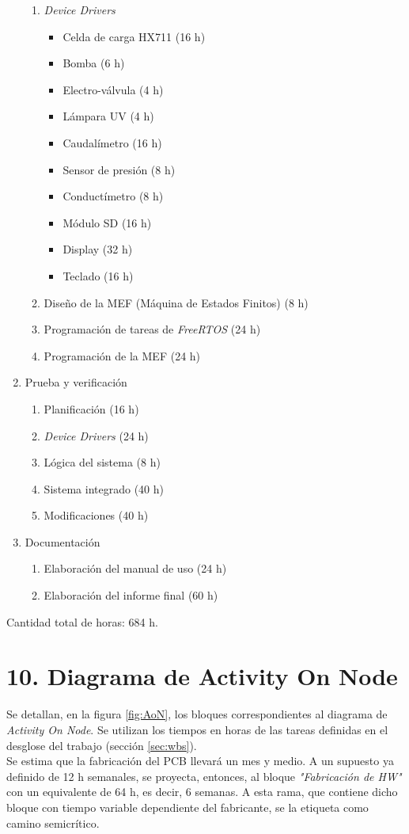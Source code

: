 \documentclass[
11pt, %
]{charter}
\begin{document}
\begin{enumerate}
	\begin{enumerate}
	\item \textit{Device Drivers}
		\begin{itemize}
			\item Celda de carga HX711 (16 h)
			\item Bomba (6 h)
			\item Electro-válvula (4 h)
			\item Lámpara UV (4 h)
			\item Caudalímetro (16 h)
			\item Sensor de presión (8 h)
			\item Conductímetro (8 h)
			\item Módulo SD (16 h)
			\item Display (32 h)
			\item Teclado (16 h)
		\end{itemize}
	\item Diseño de la MEF (Máquina de Estados Finitos) (8 h)
	\item Programación de tareas de \textit{FreeRTOS} (24 h)
	\item Programación de la MEF (24 h)
	\end{enumerate}
\item Prueba y verificación
	\begin{enumerate}
		\item Planificación (16 h)
		\item \textit{Device Drivers} (24 h)
		\item Lógica del sistema (8 h)
		\item Sistema integrado (40 h)
		\item Modificaciones (40 h)
	\end{enumerate}
\item Documentación
	\begin{enumerate}
		\item Elaboración del manual de uso (24 h)
		\item Elaboración del informe final (60 h)
	\end{enumerate}
\end{enumerate}

Cantidad total de horas: 684 h.

\section{10. Diagrama de Activity On Node}
\label{sec:AoN}

Se detallan, en la figura \ref{fig:AoN}, los bloques correspondientes al diagrama de \textit{Activity On Node}. Se utilizan los tiempos en horas de las tareas definidas en el desglose del trabajo (sección \ref{sec:wbs}).\\
Se estima que la fabricación del PCB llevará un mes y medio. A un supuesto ya definido de 12 h semanales, se proyecta, entonces, al bloque \textit{"Fabricación de HW"} con un equivalente de 64 h, es decir, 6 semanas. A esta rama, que contiene dicho bloque con tiempo variable dependiente del fabricante, se la etiqueta como camino semicrítico.
\end{document}
